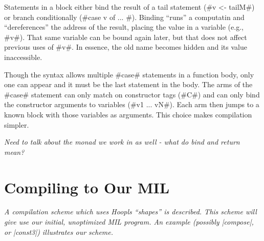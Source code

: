 \documentclass[12pt]{report}
\begin{document}
Statements in a block either bind the result of a tail statement 
(#v <- tailM#) or branch conditionally (#case v of ... #). Binding ``runs''
a computatin and ``dereferences'' the address of the result, placing
the value in a variable (e.g., #v#). That same variable can be bound
again later, but that does not affect previous uses of #v#. In essence, the old
name becomes hidden and its value inaccessible.

Though the syntax allows multiple #case# statements in a function
body, only one can appear and it must be the last statement in the
body. The arms of the #case# statement can only match on constructor
tags (#C#) and can only bind the constructor arguments to variables
(#v1 ... vN#). Each arm then jumps to a known block with those
variables as arguments. This choice makes compilation simpler.



\emph{Need to talk about the monad we work in as well - what 
do bind and return mean?}

\section{Compiling to Our MIL}
\emph{A compilation scheme which uses Hoopls ``shapes'' is
described. This scheme will give use our initial, unoptimized
MIL program. An example (possibly |compose|, or |const3|) illustrates 
our scheme.}
\end{document}
